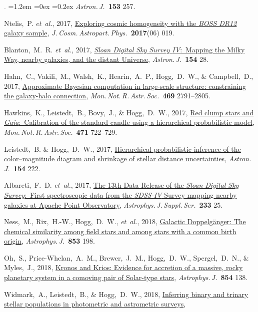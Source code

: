 \documentclass[10pt,letterpaper]{article}
\newcommand{\acronym}[1]{{\small{#1}}}
\newcommand{\foreign}[1]{\textsl{#1}}
\newcommand{\etal}{\foreign{et~al.}}
\newcommand{\project}[1]{\textsl{#1}}
\newcommand{\doi}[2]{\href{http://dx.doi.org/#1}{{#2}}}
\newcommand{\deemph}[1]{\textcolor{grey}{\footnotesize{#1}}}
\newcommand{\pubnumber}[1]{\deemph{{#1}.}}
\newcounter{refpubnum}
\newcommand{\hogglist}{%
    \rightmargin=0in
    \leftmargin=1.2em
    \topsep=0ex
    \partopsep=0pt
    \itemsep=0.2ex
    \parsep=0pt
    \itemindent=-1.0\leftmargin
    \listparindent=0.0\leftmargin
    \settowidth{\labelsep}{~}
    \usecounter{refpubnum}
  }
\begin{document}
\begin{list}{\pubnumber{\therefpubnum}}{\hogglist}
\textit{Astron.\,J.}\ \textbf{153} 257.
\item
Ntelis,~P. \etal, 2017,
\doi{10.1088/1475-7516/2017/06/019}{Exploring cosmic homogeneity with the \project{\acronym{BOSS DR12}} galaxy sample},
\textit{J.\,Cosm.\,Astropart.\,Phys.}\ \textbf{2017}(06) 019.
\item
Blanton,~M.~R. \etal, 2017,
\doi{10.3847/1538-3881/aa7567}{\project{Sloan Digital Sky Survey \acronym{IV}}:\ Mapping the Milky Way, nearby galaxies, and the distant Universe},
\textit{Astron.\,J.}\ \textbf{154} 28.
\item
Hahn,~C., Vakili,~M., Walsh,~K., Hearin,~A.~P., Hogg,~D.~W., \& Campbell,~D., 2017,
\doi{10.1093/mnras/stx894}{Approximate Bayesian computation in large-scale structure: constraining the galaxy-halo connection},
\textit{Mon.\,Not.\,R.\,Astr.\,Soc.}\ \textbf{469} 2791--2805.
\item
Hawkins,~K., Leistedt,~B., Bovy,~J., \& Hogg,~D.~W., 2017,
\doi{10.1093/mnras/stx1655}{Red clump stars and \project{Gaia}:\ Calibration of the standard candle using a hierarchical probabilistic model},
\textit{Mon.\,Not.\,R.\,Astr.\,Soc.}\ \textbf{471} 722--729.
\item
Leistedt,~B. \& Hogg,~D.~W., 2017,
\doi{10.3847/1538-3881/aa91d5}{Hierarchical probabilistic inference of the color--magnitude diagram and shrinkage of stellar distance uncertainties},
\textit{Astron.\,J.}\ \textbf{154} 222.
\item
Albareti,~F.~D. \etal, 2017,
\doi{10.3847/1538-4365/aa8992}{The 13th Data Release of the \project{Sloan Digital Sky Survey}:\ First spectroscopic data from the \project{\acronym{SDSS-IV}} Survey mapping nearby galaxies at Apache Point Observatory},
\textit{Astrophys.\,J.\,Suppl.\,Ser.}\ \textbf{233} 25.
\item
Ness,~M., Rix,~H.-W., Hogg,~D.~W., \etal, 2018,
\doi{10.3847/1538-4357/aa9d8e}{Galactic Doppelg\"anger: The chemical similarity among field stars and among stars with a common birth origin},
\textit{Astrophys.\,J.}\ \textbf{853} 198.
\item
Oh,~S., Price-Whelan,~A.~M., Brewer,~J.~M., Hogg,~D.~W., Spergel,~D.~N., \& Myles,~J., 2018,
\doi{10.3847/1538-4357/aaab4d}{Kronos and Krios: Evidence for accretion of a massive, rocky planetary system in a comoving pair of Solar-type stars},
\textit{Astrophys.\,J.}\ \textbf{854} 138.
\item
Widmark,~A., Leistedt,~B., \& Hogg,~D.~W., 2018,
\doi{10.3847/1538-4357/aab7ee}{Inferring binary and trinary stellar populations in photometric and astrometric surveys},

\end{list}
\end{document}
